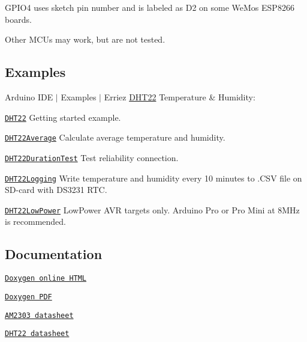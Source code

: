 \begin{DoxyItemize}
\item {\ttfamily G\+P\+I\+O4} uses sketch pin number {} and is labeled as {\ttfamily D2} on some We\+Mos E\+S\+P8266 boards.
\item Other M\+CU\textquotesingle{}s may work, but are not tested.
\end{DoxyItemize}

\subsection*{Examples}

Arduino I\+DE $\vert$ Examples $\vert$ Erriez \hyperlink{class_d_h_t22}{D\+H\+T22} Temperature \& Humidity\+:


\begin{DoxyItemize}
\item \href{https://github.com/Erriez/ErriezDHT22/blob/master/examples/DHT22/DHT22.ino}{\tt D\+H\+T22} Getting started example.
\item \href{https://github.com/Erriez/ErriezDHT22/blob/master/examples/DHT22Average/DHT22Average.ino}{\tt D\+H\+T22\+Average} Calculate average temperature and humidity.
\item \href{https://github.com/Erriez/ErriezDHT22/blob/master/examples/DHT22DurationTest/DHT22DurationTest.ino}{\tt D\+H\+T22\+Duration\+Test} Test reliability connection.
\item \href{https://github.com/Erriez/ErriezDHT22/blob/master/examples/DHT22Logging/DHT22Logging.ino}{\tt D\+H\+T22\+Logging} Write temperature and humidity every 10 minutes to .C\+SV file on S\+D-\/card with D\+S3231 R\+TC.
\item \href{https://github.com/Erriez/ErriezDHT22/blob/master/examples/DHT22LowPower/DHT22LowPower.ino}{\tt D\+H\+T22\+Low\+Power} Low\+Power A\+VR targets only. Arduino Pro or Pro Mini at 8\+M\+Hz is recommended.
\end{DoxyItemize}

\subsection*{Documentation}


\begin{DoxyItemize}
\item \href{https://erriez.github.io/ErriezDHT22}{\tt Doxygen online H\+T\+ML}
\item \href{https://github.com/Erriez/ErriezDHT22/raw/gh-pages/latex/ErriezDHT22.pdf}{\tt Doxygen P\+DF}
\item \href{https://raw.githubusercontent.com/Erriez/ErriezDHT22/master/extras/AM2303_datasheet.pdf}{\tt A\+M2303 datasheet}
\item \href{https://www.google.com/search?q=DHT22+datasheet}{\tt D\+H\+T22 datasheet}
\end{DoxyItemize}

